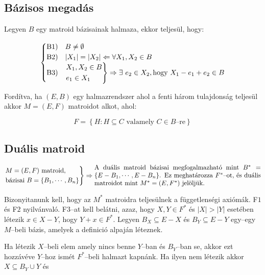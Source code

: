 \subsection{Bázisos megadás}
Legyen $B$ egy matroid bázisainak halmaza, ekkor teljesül, hogy:

\[
	\begin{cases}
		\mbox{B1)} & B \neq \emptyset                                                            \\
		\mbox{B2)} & |X_1|=|X_2| \Leftarrow \forall X_1,X_2 \in B                                \\
		\mbox{B3)} & \begin{rcases}
			             X_1, X_2 \in B \\
			             e_1 \in X_1
		             \end{rcases}\Rightarrow \exists~e_2 \in X_2, \mbox{hogy } X_1-e_1+e_2 \in B \\
	\end{cases}
\]

Fordítva, ha $(E,B)$ egy halmazrendszer ahol a fenti három tulajdonság teljesül akkor $M=(E,F)$
matroidot alkot, ahol:

\[
	F = \left\{H: H \subseteq C \mbox{ valamely } C \in B\mbox{--re}\right\}
\]

\subsection{Duális matroid}

\[
	\begin{rcases}
		M=(E,F) \mbox{ matroid}, \\
		\mbox{bázisai } B=\{B_1, \cdots, B_n\}
	\end{rcases} \Rightarrow
	\parbox[L]{9cm} {
		A duális matroid bázisai megfogalmazható mint $B^*=\{E-B_1, \cdots, E-B_n\}$.
		Ez meghatározza $F^*$--ot, és duális matroidot mint $M^*=(E,F^*)$ jelöljük.}
\]

Bizonyitanunk kell, hogy az $M^*$ matroidra teljesülnek a függetlenségi axiómák.
F$1$ és F$2$ nyilvánvaló. F$3$--at kell belátni, azaz, hogy $X,Y \in F^*$ és
$|X|>|Y|$ esetében létezik $x \in X-Y$, hogy $Y+x \in F^*$. Legyen $B_X
	\subseteq E-X$ és $B_Y\subseteq E-Y$ egy--egy $M$--beli bázis, amelyek a
definició alpaján léteznek.

Ha létezik $X$--beli elem amely nincs benne $Y$--ban és $B_Y$--ban se, akkor
ezt hozzávéve $Y$--hoz ismét $F^*$--beli halmazt kapnánk. Ha ilyen nem létezik akkor
$X \subseteq B_Y \cup Y$ és

